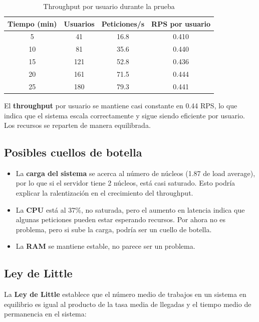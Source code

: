 \documentclass[10pt]{book}
\begin{document}
\begin{table}[H]
\centering
\begin{tabular}{|c|c|c|c|}
\hline
\textbf{Tiempo (min)} & \textbf{Usuarios} & \textbf{Peticiones/s} & \textbf{RPS por usuario} \\
\hline
5  & 41  & 16.8  & 0.410 \\
10 & 81  & 35.6  & 0.440 \\
15 & 121 & 52.8  & 0.436 \\
20 & 161 & 71.5  & 0.444 \\
25 & 180 & 79.3  & 0.441 \\
\hline
\end{tabular}
\caption{Throughput por usuario durante la prueba}
\end{table}

El \textbf{throughput} por usuario se mantiene casi constante en 0.44 RPS, lo que indica que el sistema escala correctamente y sigue siendo eficiente por usuario. Los recursos se reparten de manera equilibrada.

\subsection{Posibles cuellos de botella}

\begin{itemize}
  \item La \textbf{carga del sistema} se acerca al número de núcleos (1.87 de load average), por lo que si el servidor tiene 2 núcleos, está casi saturado. Esto podría explicar la ralentización en el crecimiento del throughput.
  
  \item La \textbf{CPU} está al 37\%, no saturada, pero el aumento en latencia indica que algunas peticiones pueden estar esperando recursos. Por ahora no es problema, pero si sube la carga, podría ser un cuello de botella.
  
  \item La \textbf{RAM} se mantiene estable, no parece ser un problema.
\end{itemize}

\subsection{Ley de Little}

La \textbf{Ley de Little} establece que el número medio de trabajos en un sistema en equilibrio es igual al producto de la tasa media de llegadas y el tiempo medio de permanencia en el sistema:
\end{document}
